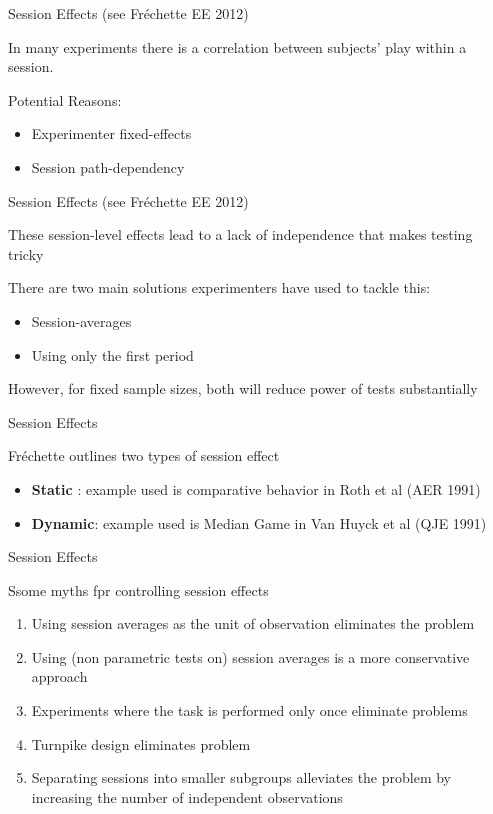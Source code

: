 \documentclass{beamer}
\begin{document}
\begin{frame}{Session Effects (see Fr\'echette EE 2012)}
	\begin{card}
		 In many experiments there is a correlation between subjects' play within a session.
		 
		 Potential Reasons:
		\begin{itemize}
			\item Experimenter fixed-effects
			\item Session path-dependency
		\end{itemize}
		\end{card}
\end{frame}

\begin{frame}{Session Effects (see Fr\'echette EE 2012)}
	\begin{card}
These session-level effects lead to a lack of independence that makes testing tricky


 There are two main solutions experimenters have used to tackle this:
		\begin{itemize}
			\item Session-averages
			\item Using only the first period
		\end{itemize}
		
However, for fixed sample sizes, both will reduce power of tests substantially
	\end{card}
\end{frame}

\begin{frame}{Session Effects }
	\begin{card}
	 Fr\'echette outlines two types of session effect
		\begin{itemize}
			\item \textbf{Static} : example used is comparative behavior in Roth et al (AER 1991)
			\item \textbf{Dynamic}: example used is Median Game in Van Huyck et al (QJE 1991)
		\end{itemize}
	\end{card}
\end{frame}

\begin{frame}{Session Effects }
	\begin{card}
	Ssome myths fpr controlling session effects
		\begin{enumerate}
			\item Using session averages as the unit of observation eliminates the problem
			\item Using (non parametric tests on) session averages is a more conservative approach
			\item Experiments where the task is performed only once eliminate problems
			\item Turnpike design eliminates problem
			\item Separating sessions into smaller subgroups alleviates the problem by increasing the number of independent observations
		\end{enumerate}
	\end{card}
\end{frame}
\end{document}
